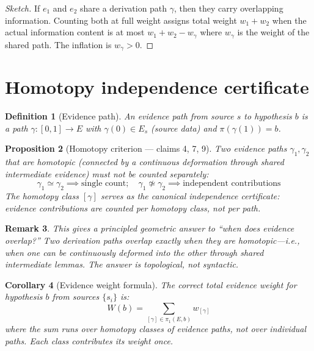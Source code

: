 \documentclass[11pt,a4paper]{article}
\newtheorem{definition}{Definition}[section]
\newtheorem{proposition}[definition]{Proposition}
\newtheorem{corollary}[definition]{Corollary}
\newtheorem{remark}[definition]{Remark}
\begin{document}
\begin{proof}[Sketch]
If $e_1$ and $e_2$ share a derivation path $\gamma$, then they carry
overlapping information. Counting both at full weight assigns total
weight $w_1 + w_2$ when the actual information content is at most
$w_1 + w_2 - w_\gamma$ where $w_\gamma$ is the weight of the shared
path. The inflation is $w_\gamma > 0$.
\end{proof}

\section{Homotopy independence certificate}

\begin{definition}[Evidence path]
An \emph{evidence path} from source $s$ to hypothesis $b$ is a path
$\gamma : [0,1] \to E$ with $\gamma(0) \in E_s$ (source data) and
$\pi(\gamma(1)) = b$.
\end{definition}

\begin{proposition}[Homotopy criterion --- claims 4, 7, 9]
\label{prop:homotopy}
Two evidence paths $\gamma_1, \gamma_2$ that are homotopic
(connected by a continuous deformation through shared intermediate
evidence) must not be counted separately:
\[
  \gamma_1 \simeq \gamma_2 \implies \text{single count}; \quad
  \gamma_1 \not\simeq \gamma_2 \implies \text{independent contributions}
\]
The homotopy class $[\gamma]$ serves as the \emph{canonical independence
certificate}: evidence contributions are counted per homotopy class,
not per path.
\end{proposition}

\begin{remark}
This gives a principled geometric answer to ``when does evidence overlap?''
Two derivation paths overlap exactly when they are homotopic---i.e., when
one can be continuously deformed into the other through shared intermediate
lemmas. The answer is topological, not syntactic.
\end{remark}

\begin{corollary}[Evidence weight formula]
The correct total evidence weight for hypothesis $b$ from sources
$\{s_i\}$ is:
\[
  W(b) = \sum_{[\gamma] \in \pi_1(E, b)} w_{[\gamma]}
\]
where the sum runs over \emph{homotopy classes} of evidence paths,
not over individual paths. Each class contributes its weight once.
\end{corollary}
\end{document}
